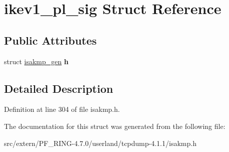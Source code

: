 \hypertarget{structikev1__pl__sig}{
\section{ikev1\_\-pl\_\-sig Struct Reference}
\label{structikev1__pl__sig}
}
\subsection*{Public Attributes}
\begin{DoxyCompactItemize}
\item 
\hypertarget{structikev1__pl__sig_a02e273f5a0ac3061e905189e17f691ae}{
struct \hyperlink{structisakmp__gen}{isakmp\_\-gen} {\bfseries h}}
\label{structikev1__pl__sig_a02e273f5a0ac3061e905189e17f691ae}

\end{DoxyCompactItemize}


\subsection{Detailed Description}


Definition at line 304 of file isakmp.h.



The documentation for this struct was generated from the following file:\begin{DoxyCompactItemize}
\item 
src/extern/PF\_\-RING-\/4.7.0/userland/tcpdump-\/4.1.1/isakmp.h\end{DoxyCompactItemize}
